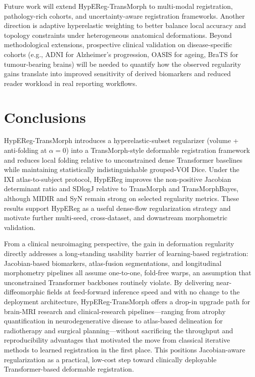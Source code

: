 \documentclass[jimaging,article,submit,pdftex,moreauthors]{Definitions/mdpi}
\begin{document}
Future work will extend HypEReg-TransMorph to multi-modal registration, pathology-rich cohorts, and uncertainty-aware registration frameworks. Another direction is adaptive hyperelastic weighting to better balance local accuracy and topology constraints under heterogeneous anatomical deformations. Beyond methodological extensions, prospective clinical validation on disease-specific cohorts (e.g., ADNI for Alzheimer's progression, OASIS for ageing, BraTS for tumour-bearing brains) will be needed to quantify how the observed regularity gains translate into improved sensitivity of derived biomarkers and reduced reader workload in real reporting workflows.

\section{Conclusions}

HypEReg-TransMorph introduces a hyperelastic-subset regularizer (volume + anti-folding at \(\alpha=0\)) into a TransMorph-style deformable registration framework and reduces local folding relative to unconstrained dense Transformer baselines while maintaining statistically indistinguishable grouped-VOI Dice. Under the IXI atlas-to-subject protocol, HypEReg improves the non-positive Jacobian determinant ratio and SDlogJ relative to TransMorph and TransMorphBayes, although MIDIR and SyN remain strong on selected regularity metrics. These results support HypEReg as a useful dense-flow regularization strategy and motivate further multi-seed, cross-dataset, and downstream morphometric validation.

From a clinical neuroimaging perspective, the gain in deformation regularity directly addresses a long-standing usability barrier of learning-based registration: Jacobian-based biomarkers, atlas-fusion segmentations, and longitudinal morphometry pipelines all assume one-to-one, fold-free warps, an assumption that unconstrained Transformer backbones routinely violate. By delivering near-diffeomorphic fields at feed-forward inference speed and with no change to the deployment architecture, HypEReg-TransMorph offers a drop-in upgrade path for brain-MRI research and clinical-research pipelines---ranging from atrophy quantification in neurodegenerative disease to atlas-based delineation for radiotherapy and surgical planning---without sacrificing the throughput and reproducibility advantages that motivated the move from classical iterative methods to learned registration in the first place. This positions Jacobian-aware regularization as a practical, low-cost step toward clinically deployable Transformer-based deformable registration.
\end{document}

